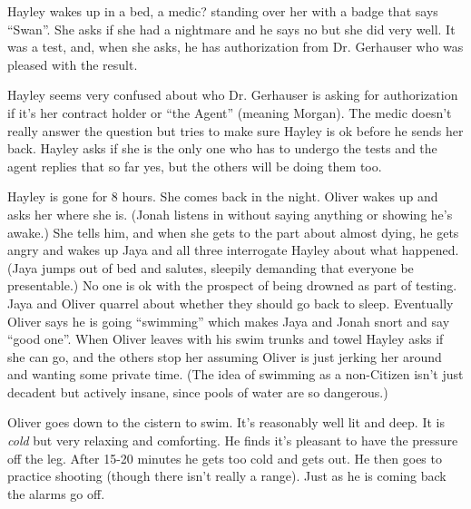 Hayley wakes up in a bed, a medic? standing over her with a badge that says ``Swan''.  She asks if she had a nightmare and he says no but she did very well.  It was a test, and, when she asks, he has authorization from Dr. Gerhauser who was pleased with the result.



Hayley seems very confused about who Dr. Gerhauser is asking for authorization if it's her contract holder or ``the Agent'' (meaning Morgan).  The medic doesn't really answer the question but tries to make sure Hayley is ok before he sends her back.  Hayley asks if she is the only one who has to undergo the tests and the agent replies that so far yes, but the others will be doing them too.



Hayley is gone for 8 hours.  She comes back in the night.  Oliver wakes up and asks her where she is.  (Jonah listens in without saying anything or showing he's awake.)  She tells him, and when she gets to the part about almost dying, he gets angry and wakes up Jaya and all three interrogate Hayley about what happened.  (Jaya jumps out of bed and salutes, sleepily demanding that everyone be presentable.)  No one is ok with the prospect of being drowned as part of testing.  Jaya and Oliver quarrel about whether they should go back to sleep.  Eventually Oliver says he is going ``swimming'' which makes Jaya and Jonah snort and say ``good one''.  When Oliver leaves with his swim trunks and towel Hayley asks if she can go, and the others stop her assuming Oliver is just jerking her around and wanting some private time.  (The idea of swimming as a non-Citizen isn't just decadent but actively insane, since pools of water are so dangerous.)




Oliver goes down to the cistern to swim.  It's reasonably well lit and deep.  It is \textit{cold} but very relaxing and comforting.  He finds it's pleasant to have the pressure off the leg.   After 15-20 minutes he gets too cold and gets out.  He then goes to practice shooting (though there isn't really a range).  Just as he is coming back the alarms go off.



